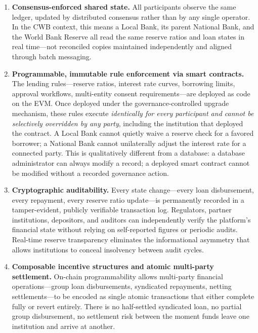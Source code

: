 \documentclass[12pt,a4paper]{report}
\begin{document}
\begin{enumerate}[noitemsep]
\item \textbf{Consensus-enforced shared state.} All participants observe the same ledger, updated by distributed consensus rather than by any single operator. In the CWB context, this means a Local Bank, its parent National Bank, and the World Bank Reserve all read the same reserve ratios and loan states in real time---not reconciled copies maintained independently and aligned through batch messaging.

\item \textbf{Programmable, immutable rule enforcement via smart contracts.} The lending rules---reserve ratios, interest rate curves, borrowing limits, approval workflows, multi-entity consent requirements---are deployed as code on the EVM. Once deployed under the governance-controlled upgrade mechanism, these rules execute \textit{identically for every participant and cannot be selectively overridden by any party}, including the institution that deployed the contract. A Local Bank cannot quietly waive a reserve check for a favored borrower; a National Bank cannot unilaterally adjust the interest rate for a connected party. This is qualitatively different from a database: a database administrator can always modify a record; a deployed smart contract cannot be modified without a recorded governance action.

\item \textbf{Cryptographic auditability.} Every state change---every loan disbursement, every repayment, every reserve ratio update---is permanently recorded in a tamper-evident, publicly verifiable transaction log. Regulators, partner institutions, depositors, and auditors can independently verify the platform's financial state without relying on self-reported figures or periodic audits. Real-time reserve transparency eliminates the informational asymmetry that allows institutions to conceal insolvency between audit cycles.

\item \textbf{Composable incentive structures and atomic multi-party settlement.} On-chain programmability allows multi-party financial operations---group loan disbursements, syndicated repayments, netting settlements---to be encoded as single atomic transactions that either complete fully or revert entirely. There is no half-settled syndicated loan, no partial group disbursement, no settlement risk between the moment funds leave one institution and arrive at another.
\end{enumerate}
\end{document}
